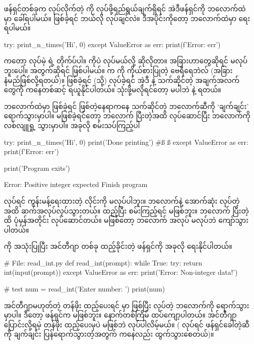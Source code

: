 ဖန်ရှင်တစ်ခုက  လုပ်လိုက်တဲ့  ကို  လုပ်ဖို့ရည်ရွယ်ချက်ရှိရင် အဲဒီဖန်ရှင်ကို   ဘလောက်ထဲမှာ ခေါ်ရပါမယ်။  ဖြစ်ခဲ့ရင် ဘယ်လို  လုပ်ချင်လဲ။ ဒီအပိုင်းကိုတော့  ဘလောက်ထဲမှာ ရေးရပါမယ်။
%
\begin{py}
try:
    print_n_times('Hi', 0)
except ValueError as err:
    print(f'Error: {err}')
\end{py}
%
 ကတော့  လုပ်မဲ့  ရဲ့ တိုက်ပ်ပါ။    ကိုပဲ  လုပ်မယ်လို့ ဆိုလိုတာ။ အခြားဟာတွေဆိုရင်  မလုပ်ဘူးပေါ့။  အတွက်ဆိုရင်  ဖြစ်ပါမယ်။   က  ကို ကိုယ်စားပြုတဲ့  ဗေရီရေဘဲလ် (အခြား နံမည်ဖြစ်လို့ရတယ်)။  ဖြစ်ခဲ့ရင် (သို့)  လုပ်ခဲ့ရင် အဲ့ဒီ   နဲ့ သက်ဆိုင်တဲ့ အချက်အလက်တွေကို   ကနေတစ်ဆင့် ရယူနိုင်ပါတယ်။ သုံးဖို့မလိုရင်တော့  မပါဘဲ  နဲ့ ရတယ်။

 ဘလောက်ထဲမှာ  ဖြစ်ခဲ့ရင် ဖြစ်တဲ့နေရာကနေ သက်ဆိုင်တဲ့  ဘလောက်ဆီကို ‘ချက်ချင်း’ ရောက်သွားမှာပါ။ မဖြစ်ခဲ့ရင်တော့  ဘလောက် ပြီးတဲ့အထိ လုပ်ဆောင်ပြီး  ဘလောက်ကို လစ်လျူရှု့ သွားမှာပါ။ အခုလို စမ်းသပ်ကြည့်ပါ
%
\begin{py}
try:
    print_n_times('Hi', 0)
    print('Done printing') #ß  ß
except ValueError as err:
    print(f'Error: {err}')

print('Program exits')
\end{py}
{}
\begin{codetxt}
Error: Positive integer expected
Finish program
\end{codetxt}
 လုပ်ရင် ကွန်းမန့်ရေးထားတဲ့ လိုင်းကို မလုပ်ပါဘူး။  ဘလောက်နဲ့ အောက်ဆုံး  လုပ်တဲ့အထိ ဆက်အလုပ်လုပ်သွားတယ်။  ထည့်ပြီး စမ်းကြည့်ရင်  မဖြစ်ဘူး။  ဘလောက် ပြီးတဲ့ထိ ပုံမှန်အတိုင်း လုပ်ဆောင်တယ်။  မဖြစ်တော့  ဘလောက် အလုပ် မလုပ်ဘဲ ကျော်သွားပါတယ်။

 ကို အသုံးပြုပြီး အင်တီဂျာ တစ်ခု  ထည့်ခိုင်းတဲ့ ဖန်ရှင်ကို အခုလို ရေးနိုင်ပါတယ်။
%
\begin{py}
# File: read_int.py
def read_int(prompt):
    while True:
        try:
            return int(input(prompt))
        except ValueError as err:
            print('Error: Non-integer data!')

# test 
num = read_int('Enter number: ')
print(num)
\end{py}
%
အင်တီဂျာမဟုတ်တဲ့ တန်ဖိုး ထည့်ပေးရင်  မှာ   ဖြစ်ပြီး  လုပ်တဲ့ ဘလောက်ကို ရောက်သွားမှာပါ။ ဒီတော့ ဖန်ရှင်က  မဖြစ်ဘူး။   နောက်တစ်ကြိမ် ထပ်ကျော့ပါတယ်။ အင်တီဂျာ ပြောင်းလို့ရမဲ့ တန်ဖိုး ထည့်ပေးမှပဲ  မဖြစ်ဘဲ   လုပ်ပါလိမ့်မယ်။ ( လုပ်ရင် ဖန်ရှင်ခေါ်တဲ့ဆီကို ချက်ချင်း ပြန်ရောက်သွားတဲ့အတွက်  ကနေလည်း ထွက်သွားစေတယ်)။ 


